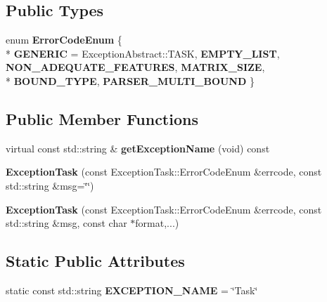 \subsection*{Public Types}
\begin{DoxyCompactItemize}
\item 
enum {\bfseries Error\+Code\+Enum} \{ \\*
{\bfseries G\+E\+N\+E\+R\+IC} = Exception\+Abstract\+:\+:T\+A\+SK, 
{\bfseries E\+M\+P\+T\+Y\+\_\+\+L\+I\+ST}, 
{\bfseries N\+O\+N\+\_\+\+A\+D\+E\+Q\+U\+A\+T\+E\+\_\+\+F\+E\+A\+T\+U\+R\+ES}, 
{\bfseries M\+A\+T\+R\+I\+X\+\_\+\+S\+I\+ZE}, 
\\*
{\bfseries B\+O\+U\+N\+D\+\_\+\+T\+Y\+PE}, 
{\bfseries P\+A\+R\+S\+E\+R\+\_\+\+M\+U\+L\+T\+I\+\_\+\+B\+O\+U\+ND}
 \}\hypertarget{classdynamic__graph_1_1ExceptionTask_a0ccd75121639190d176ffd062e0d69d8}{}\label{classdynamic__graph_1_1ExceptionTask_a0ccd75121639190d176ffd062e0d69d8}

\end{DoxyCompactItemize}
\subsection*{Public Member Functions}
\begin{DoxyCompactItemize}
\item 
virtual const std\+::string \& {\bfseries get\+Exception\+Name} (void) const \hypertarget{classdynamic__graph_1_1ExceptionTask_a7ed756498ca26263200532a84abc5160}{}\label{classdynamic__graph_1_1ExceptionTask_a7ed756498ca26263200532a84abc5160}

\item 
{\bfseries Exception\+Task} (const Exception\+Task\+::\+Error\+Code\+Enum \&errcode, const std\+::string \&msg=\char`\"{}\char`\"{})\hypertarget{classdynamic__graph_1_1ExceptionTask_af05ac9817dc1de874190803ed92321a8}{}\label{classdynamic__graph_1_1ExceptionTask_af05ac9817dc1de874190803ed92321a8}

\item 
{\bfseries Exception\+Task} (const Exception\+Task\+::\+Error\+Code\+Enum \&errcode, const std\+::string \&msg, const char $\ast$format,...)\hypertarget{classdynamic__graph_1_1ExceptionTask_ac9bd1b490d5758bf1c7eecaeee6cebe9}{}\label{classdynamic__graph_1_1ExceptionTask_ac9bd1b490d5758bf1c7eecaeee6cebe9}

\end{DoxyCompactItemize}
\subsection*{Static Public Attributes}
\begin{DoxyCompactItemize}
\item 
static const std\+::string {\bfseries E\+X\+C\+E\+P\+T\+I\+O\+N\+\_\+\+N\+A\+ME} = \char`\"{}Task\char`\"{}\hypertarget{classdynamic__graph_1_1ExceptionTask_ad36eb4b540be350af2b24895955dcc0a}{}\label{classdynamic__graph_1_1ExceptionTask_ad36eb4b540be350af2b24895955dcc0a}

\end{DoxyCompactItemize}
